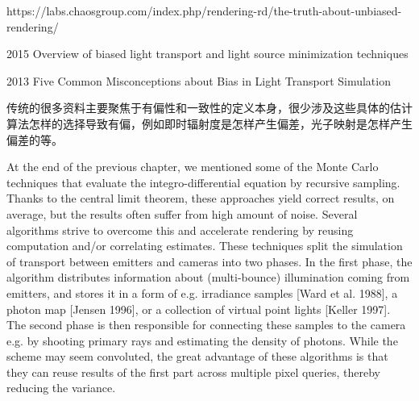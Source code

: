 


https://labs.chaosgroup.com/index.php/rendering-rd/the-truth-about-unbiased-rendering/


2015 Overview of biased light transport and light source minimization techniques

2013 Five Common Misconceptions about Bias in Light Transport Simulation

传统的很多资料主要聚焦于有偏性和一致性的定义本身，很少涉及这些具体的估计算法怎样的选择导致有偏，例如即时辐射度是怎样产生偏差，光子映射是怎样产生偏差的等。



At the end of the previous chapter, we mentioned some of the Monte Carlo techniques that evaluate the integro-differential equation by recursive sampling. Thanks to the central limit theorem, these approaches yield correct results, on average, but the results often suffer from high amount of noise. Several algorithms strive to overcome this and accelerate rendering by reusing computation and/or correlating estimates. These techniques split the simulation of transport between emitters and cameras into two phases. In the first phase, the algorithm distributes information about (multi-bounce) illumination coming from emitters, and stores it in a form of e.g. irradiance samples [Ward et al. 1988], a photon map [Jensen 1996], or a collection of virtual point lights [Keller 1997]. The second phase is then responsible for connecting these samples to the camera e.g. by shooting primary rays and estimating the density of photons. While the scheme may seem convoluted, the great advantage of these algorithms is that they can reuse results of the first part across multiple pixel queries, thereby reducing the variance.